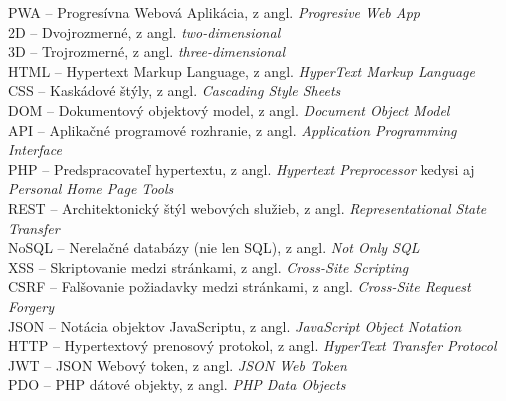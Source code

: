%
%
PWA -- Progresívna Webová Aplikácia, z angl. \emph{\foreignlanguage{english}{Progresive Web App}}\\
2D -- Dvojrozmerné, z angl. \emph{\foreignlanguage{english}{two-dimensional}}\\
3D -- Trojrozmerné, z angl. \emph{\foreignlanguage{english}{three-dimensional}}\\
HTML -- Hypertext Markup Language, z angl. \emph{\foreignlanguage{english}{HyperText Markup Language}}\\
CSS -- Kaskádové štýly, z angl. \emph{\foreignlanguage{english}{Cascading Style Sheets}}\\
DOM -- Dokumentový objektový model, z angl. \emph{\foreignlanguage{english}{Document Object Model}}\\
API -- Aplikačné programové rozhranie, z angl. \emph{\foreignlanguage{english}{Application Programming Interface}}\\
PHP -- Predspracovateľ hypertextu, z angl. \emph{\foreignlanguage{english}{Hypertext Preprocessor}} kedysi aj \emph{\foreignlanguage{english}{Personal Home Page Tools}}\\
REST -- Architektonický štýl webových služieb, z angl. \emph{\foreignlanguage{english}{Representational State Transfer}}\\
NoSQL -- Nerelačné databázy (nie len SQL), z angl. \emph{\foreignlanguage{english}{Not Only SQL}}\\
XSS -- Skriptovanie medzi stránkami, z angl. \emph{\foreignlanguage{english}{Cross-Site Scripting}}\\
CSRF -- Falšovanie požiadavky medzi stránkami, z angl. \emph{\foreignlanguage{english}{Cross-Site Request Forgery}}\\
JSON -- Notácia objektov JavaScriptu, z angl. \emph{\foreignlanguage{english}{JavaScript Object Notation}}\\
HTTP -- Hypertextový prenosový protokol, z angl. \emph{\foreignlanguage{english}{HyperText Transfer Protocol}}\\
JWT -- JSON Webový token, z angl. \emph{\foreignlanguage{english}{JSON Web Token}}\\
PDO -- PHP dátové objekty, z angl. \emph{\foreignlanguage{english}{PHP Data Objects}}\\
